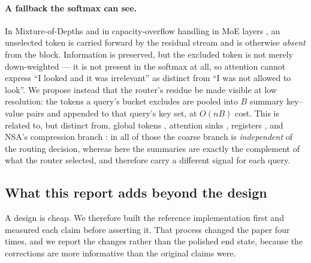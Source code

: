 \paragraph{A fallback the softmax can see.} In Mixture-of-Depths \citep{raposo2024mixture} and in capacity-overflow handling in MoE layers \citep{fedus2022switch,lepikhin2021gshard}, an unselected token is carried forward by the residual stream and is otherwise \emph{absent} from the block. Information is preserved, but the excluded token is not merely down-weighted --- it is not present in the softmax at all, so attention cannot express ``I looked and it was irrelevant'' as distinct from ``I was not allowed to look''. We propose instead that the router's residue be made visible at low resolution: the tokens a query's bucket excludes are pooled into $B$ summary key--value pairs and appended to that query's key set, at $O(nB)$ cost. This is related to, but distinct from, global tokens \citep{beltagy2020longformer,zaheer2020bigbird}, attention sinks \citep{xiao2024streaming}, registers \citep{darcet2024registers}, and NSA's compression branch \citep{yuan2025nsa}: in all of those the coarse branch is \emph{independent} of the routing decision, whereas here the summaries are exactly the complement of what the router selected, and therefore carry a different signal for each query.

\subsection{What this report adds beyond the design}
\label{sec:contributions}

A design is cheap. We therefore built the reference implementation first and measured each claim before asserting it. That process changed the paper four times, and we report the changes rather than the polished end state, because the corrections are more informative than the original claims were.

